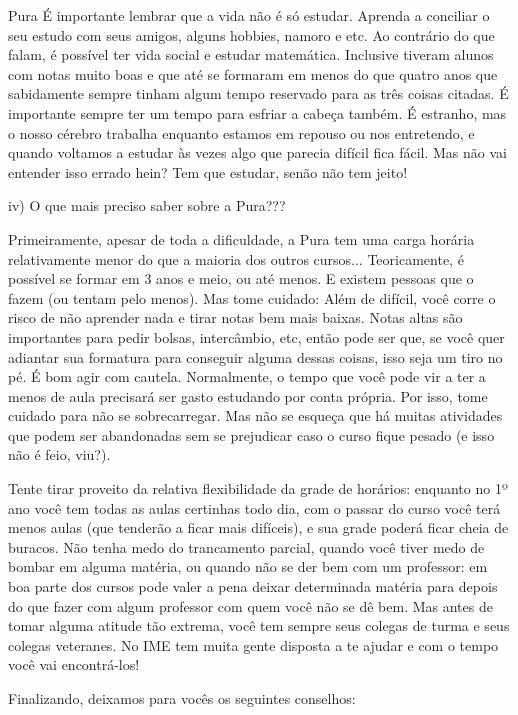 \begin{subsecao}{Pura}
É importante lembrar que a vida não é só estudar. Aprenda a conciliar o seu estudo
com seus amigos, alguns hobbies, namoro e etc. Ao contrário do que falam, é
possível ter vida social e estudar matemática. Inclusive tiveram alunos com notas
muito boas e que até se formaram em menos do que quatro anos que sabidamente
sempre tinham algum tempo reservado para as três coisas citadas. É importante
sempre ter um tempo para esfriar a cabeça também. É estranho, mas o nosso cérebro
trabalha enquanto estamos em repouso ou nos entretendo, e quando voltamos a estudar
às vezes algo que parecia difícil fica fácil. Mas não vai entender isso errado
hein? Tem que estudar, senão não tem jeito!

iv) O que mais preciso saber sobre a Pura???

Primeiramente, apesar de toda a dificuldade, a Pura tem uma carga horária
relativamente menor do que a maioria dos outros cursos... Teoricamente, é
possível se formar em 3 anos e meio, ou até menos. E existem pessoas que o
fazem (ou tentam pelo menos). Mas tome cuidado: Além de difícil, você
corre o risco de não aprender nada e tirar notas bem mais baixas. Notas altas
são importantes para pedir bolsas, intercâmbio, etc, então pode ser que, se você
quer adiantar sua formatura para conseguir alguma dessas coisas, isso seja um
tiro no pé. É bom agir com cautela. Normalmente, o tempo que você pode vir a ter
a menos de aula precisará ser gasto estudando por conta própria. Por isso, tome
cuidado para não se sobrecarregar. Mas não se esqueça que há muitas atividades
que podem ser abandonadas sem se prejudicar caso o curso fique pesado (e isso não é feio, viu?).

Tente tirar proveito da relativa flexibilidade da grade de horários: enquanto
no 1º ano você tem todas as aulas certinhas todo dia, com o passar do
curso você terá menos aulas (que tenderão a ficar mais difíceis), e sua
grade poderá ficar cheia de buracos. Não tenha medo do trancamento parcial,
quando você tiver medo de bombar em alguma matéria, ou quando não se der bem com
um professor: em boa parte dos cursos pode valer a pena deixar determinada
matéria para depois do que fazer com algum professor com quem você não se dê
bem. Mas antes de tomar alguma atitude tão extrema, você tem sempre seus colegas
de turma e seus colegas veteranes. No IME tem muita gente disposta a te ajudar e
com o tempo você vai encontrá-los!

Finalizando, deixamos para vocês os seguintes conselhos:
\begin{enumerate}


\end{enumerate}
\end{subsecao}
